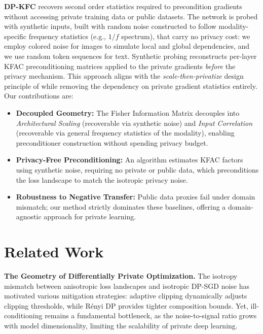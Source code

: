 \documentclass{article}
\theoremstyle{plain}
\theoremstyle{definition}
\theoremstyle{remark}
\begin{document}
\vspace{1em}
\textbf{DP-KFC} recovers second order statistics required to precondition gradients without accessing private training data or public datasets. The network is probed with synthetic inputs, built with random noise constructed to follow modality-specific frequency statistics (e.g., $1/f$ spectrum), that carry no privacy cost: we employ colored noise for images to simulate local and global dependencies, and we use random token sequences for text. Synthetic probing reconstructs per-layer KFAC preconditioning matrices applied to the private gradients \textit{before} the privacy mechanism. This approach aligns with the \textit{scale-then-privatize} design principle of \citet{ganesh2025designprinciplesprivateadaptive} while removing the dependency on private gradient statistics entirely. Our contributions are:

\begin{itemize}
    \item \textbf{Decoupled Geometry:} The Fisher Information Matrix decouples into \textit{Architectural Scaling} (recoverable via synthetic noise) and \textit{Input Correlation} (recoverable via general frequency statistics of the modality), enabling preconditioner construction without spending privacy budget.
    \item \textbf{Privacy-Free Preconditioning:} An algorithm estimates KFAC factors using synthetic noise, requiring no private or public data, which preconditions the loss landscape to match the isotropic privacy noise.
    \item \textbf{Robustness to Negative Transfer:} Public data proxies fail under domain mismatch; our method strictly dominates these baselines, offering a domain-agnostic approach for private learning.
\end{itemize}

\section{Related Work}
\label{sec:related_work}

\textbf{The Geometry of Differentially Private Optimization.} The isotropy mismatch between anisotropic loss landscapes and isotropic DP-SGD noise has motivated various mitigation strategies: adaptive clipping \cite{DBLP:journals/corr/abs-1905-03871, andrew2021differentially} dynamically adjusts clipping thresholds, while Rényi DP \cite{Mironov_2017} provides tighter composition bounds. Yet, ill-conditioning remains a fundamental bottleneck, as the noise-to-signal ratio grows with model dimensionality, limiting the scalability of private deep learning.
\end{document}
